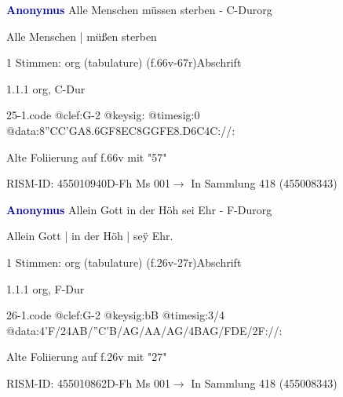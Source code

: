 \documentclass[twocolumn]{book}
\begin{document}
\par \vspace{7pt} \textcolor{darkblue}{\textbf{Anonymus  }}\hfillplus{\textbf{[25]}}\newline Alle Menschen müssen sterben - C-Dur\newline org
\par \begin{itshape}[f.66v, at left:] Alle Menschen | müßen sterben\end{itshape} 
\par \textcolor{darkblue}{}  1 Stimmen: org (tabulature)  (f.66v-67r)\newline Abschrift
\par 1.1.1  org, C-Dur  
\begin{filecontents*}{25-1.code}
@clef:G-2
@keysig:
@timesig:0
@data:{8''CC'GA}{8.6GF8EC}{8GGFE}{8.D6C}4C://:
\end{filecontents*}
\newline
%
\par Alte Foliierung auf f.66v mit "57"
\par RISM-ID: 455010940\newline D-Fh  Ms 001\newline $\rightarrow$ In Sammlung 418 (455008343)
      
\par \vspace{7pt} \textcolor{darkblue}{\textbf{Anonymus  }}\hfillplus{\textbf{[26]}}\newline Allein Gott in der Höh sei Ehr - F-Dur\newline org
\par \begin{itshape}[f.26v, at left:] Allein Gott | in der Höh | seÿ Ehr.\end{itshape} 
\par \textcolor{darkblue}{}  1 Stimmen: org (tabulature)  (f.26v-27r)\newline Abschrift
\par 1.1.1  org, F-Dur  
\begin{filecontents*}{26-1.code}
@clef:G-2
@keysig:bB
@timesig:3/4
@data:4'F/24AB/''C'B/AG/AA/AG/4BAG/FDE/2F://:
\end{filecontents*}
\newline
%
\par Alte Foliierung auf f.26v mit "27"
\par RISM-ID: 455010862\newline D-Fh  Ms 001\newline $\rightarrow$ In Sammlung 418 (455008343)
      
\end{document}
